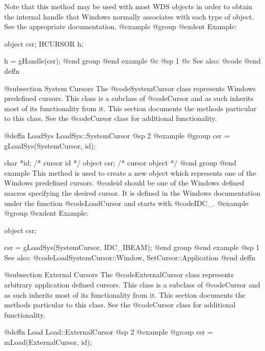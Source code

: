 Note that this method may be used with most WDS objects in order to obtain
the internal handle that Windows normally associates with each type of object.
See the appropriate documentation.
@example
@group
@exdent Example:

object  csr;
HCURSOR h;

h = gHandle(csr);
@end group
@end example
@c @sp 1
@c See also:  @code{}
@end deffn









@subsection System Cursors
The @code{SystemCursor} class represents Windows predefined cursors.
This class is a subclass of @code{Cursor} and as such inherits most
of its functionality from it.  This section documents the methods
particular to this class.  See the @code{Cursor} class for additional
functionality.











@deffn {LoadSys} LoadSys::SystemCursor
@sp 2
@example
@group
csr = gLoadSys(SystemCursor, id);

char    *id;    /*  cursor id      */
object  csr;    /*  cursor object  */
@end group
@end example
This method is used to create a new object which represents one of the
Windows predefined cursors.  @code{id} should be one of the Windows
defined macros specifying the desired cursor.  It is defined in the
Windows documentation under the function @code{LoadCursor} and
starts with @code{IDC_}.
@example
@group
@exdent Example:

object  csr;

csr = gLoadSys(SystemCursor, IDC_IBEAM);
@end group
@end example
@sp 1
See also:  @code{LoadSystemCursor::Window, SetCursor::Application}
@end deffn





@subsection External Cursors
The @code{ExternalCursor} class represents arbitrary application defined
cursors.  This class is a subclass of @code{Cursor} and as such inherits
most of its functionality from it.  This section documents the methods
particular to this class.  See the @code{Cursor} class for additional
functionality.






@deffn {Load} Load::ExternalCursor
@sp 2
@example
@group
csr = mLoad(ExternalCursor, id);

